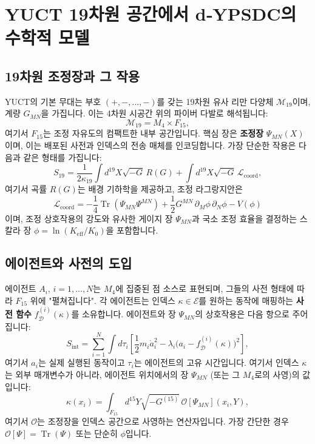\documentclass[11pt,a4paper]{article}
\DeclareMathOperator{\Tr}{Tr}
\begin{document}
	\section{YUCT 19차원 공간에서 d‑YPSDC의 수학적 모델}
	\label{sec:math-model}
	
	\subsection{19차원 조정장과 그 작용}
	
	YUCT의 기본 무대는 부호 \((+,-,\dots,-)\)를 갖는 19차원 유사 리만 다양체 \(\mathcal{M}_{19}\)이며, 계량 \(G_{MN}\)을 가집니다. 이는 4차원 시공간 위의 파이버 다발로 해석됩니다:
	\begin{equation}
		\mathcal{M}_{19} = M_4 \times F_{15},
	\end{equation}
	여기서 \(F_{15}\)는 조정 자유도의 컴팩트한 내부 공간입니다. 핵심 장은 \textbf{조정장} \(\Psi_{MN}(X)\)이며, 이는 배포된 사전과 인덱스의 전송 매체를 인코딩합니다. 가장 단순한 작용은 다음과 같은 형태를 가집니다:
	\begin{equation}
		S_{19} = \frac{1}{2\kappa_{19}} \int d^{19}X \sqrt{-G}\, R(G) + \int d^{19}X \sqrt{-G}\, \mathcal{L}_{\mathrm{coord}},
		\label{eq:S19}
	\end{equation}
	여기서 곡률 \(R(G)\)는 배경 기하학을 제공하고, 조정 라그랑지안은
	\begin{equation}
		\mathcal{L}_{\mathrm{coord}} = -\frac{1}{4} \Tr(\Psi_{MN}\Psi^{MN}) + \frac{1}{2} G^{MN}\,\partial_M \phi\,\partial_N \phi - V(\phi)
		\label{eq:Lcoord}
	\end{equation}
	이며, 조정 상호작용의 강도와 유사한 게이지 장 \(\Psi_{MN}\)과 국소 조정 효율을 결정하는 스칼라 장 \(\phi = \ln(K_{\mathrm{eff}}/K_0)\)을 포함합니다.
	
	\subsection{에이전트와 사전의 도입}
	
	에이전트 \(A_i\), \(i=1,\dots,N\)는 \(M_4\)에 집중된 점 소스로 표현되며, 그들의 사전 형태에 따라 \(F_{15}\) 위에 "펼쳐집니다". 각 에이전트는 인덱스 \(\kappa \in \mathcal{E}\)를 원하는 동작에 매핑하는 \textbf{사전 함수} \(f_{\mathcal{D}}^{(i)}(\kappa)\)를 소유합니다. 에이전트와 장 \(\Psi_{MN}\)의 상호작용은 다음 항으로 주어집니다:
	\begin{equation}
		S_{\mathrm{int}} = \sum_{i=1}^{N} \int d\tau_i \left[ \frac{1}{2} m_i \dot a_i^2 - \lambda_i \bigl( a_i - f_{\mathcal{D}}^{(i)}(\kappa) \bigr)^2 \right],
		\label{eq:Sint}
	\end{equation}
	여기서 \(a_i\)는 실제 실행된 동작이고 \(\tau_i\)는 에이전트의 고유 시간입니다. 여기서 인덱스 \(\kappa\)는 외부 매개변수가 아니라, 에이전트 위치에서의 장 \(\Psi_{MN}\) (또는 그 \(M_4\)로의 사영)의 값입니다:
	\begin{equation}
		\kappa(x_i) = \int_{F_{15}} d^{15}Y \sqrt{-G^{(15)}}\, \mathcal{O}[\Psi_{MN}](x_i, Y),
		\label{eq:kappa}
	\end{equation}
	여기서 \(\mathcal{O}\)는 조정장을 인덱스 공간으로 사영하는 연산자입니다. 가장 간단한 경우 \(\mathcal{O}[\Psi] = \Tr(\Psi)\) 또는 단순히 \(\phi\)입니다.
	
\end{document}
